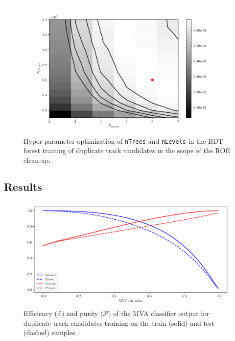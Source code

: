 \begin{figure}[H]
\centering
\captionsetup{width=0.8\linewidth}
\includegraphics[width=\linewidth]{fig/addendums/curl_hpo}
\caption{Hyper-parameter optimization of \texttt{nTrees} and \texttt{nLevels} in the BDT forest training of duplicate track candidates in the scope of the ROE clean-up.}
\end{figure}

\subsection*{Results}

\begin{figure}[H]
\centering
\captionsetup{width=0.8\linewidth}
\includegraphics[width=\linewidth]{fig/addendums/curl_effpur}
\caption{Efficiency ($\mathcal{E}$) and purity ($\mathcal{P}$) of the MVA classifier output for duplicate track candidates training on the train (solid) and test (dashed) samples.}
\end{figure}

